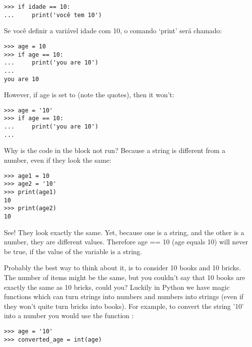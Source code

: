 \begin{listing}
\begin{verbatim}
>>> if idade == 10:
...     print('você tem 10')
\end{verbatim}
\end{listing}

Se você definir a variável idade com 10, o comando `print' será chamado:

\begin{listing}
\begin{verbatim}
>>> age = 10
>>> if age == 10:
...     print('you are 10')
...
you are 10
\end{verbatim}
\end{listing}

However, if age is set to  (note the quotes), then it won't:

\begin{listing}
\begin{verbatim}
>>> age = '10'
>>> if age == 10:
...     print('you are 10')
...
\end{verbatim}
\end{listing}

Why is the code in the block not run?  Because a string is different from a number, even if they look the same:

\begin{listing}
\begin{verbatim}
>>> age1 = 10
>>> age2 = '10'
>>> print(age1)
10
>>> print(age2)
10
\end{verbatim}
\end{listing}

See!  They look exactly the same.  Yet, because one is a string, and the other is a number, they are different values. Therefore age == 10 (age equals 10) will never be true, if the value of the variable is a string.
\par
Probably the best way to think about it, is to consider 10 books and 10 bricks.  The number of items might be the same, but you couldn't say that 10 books are exactly the same as 10 bricks, could you? Luckily in Python we have magic functions which can turn strings into numbers and numbers into strings (even if they won't quite turn bricks into books). For example, to convert the string '10' into a number you would use the function :

\begin{listing}
\begin{verbatim}
>>> age = '10'
>>> converted_age = int(age)
\end{verbatim}
\end{listing}

